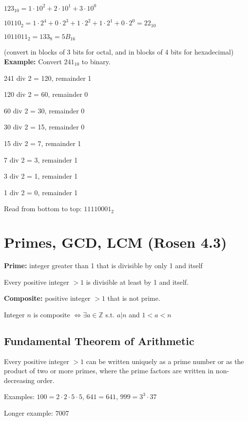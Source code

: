 \documentclass[english,openany]{book}
\begin{document}
    $123_{10} = 1 \cdot 10^2 + 2 \cdot 10^1 + 3 \cdot 10^0$

    $10110_2 = 1 \cdot 2^4 + 0 \cdot 2^3 + 1 \cdot 2^2 + 1 \cdot 2^1 + 0 \cdot 2^0 = 22_{10}$


    $1011011_2 = 133_8 = 5B_{16}$

    (convert in blocks of 3 bits for octal, and in blocks of 4 bits for hexadecimal)\\

    \textbf{Example:} Convert $241_{10}$ to binary.

    241 div 2 = 120, remainder 1

    120 div 2 = 60, remainder 0

    60 div 2 = 30, remainder 0

    30 div 2 = 15, remainder 0

    15 div 2 = 7, remainder 1

    7 div 2 = 3, remainder 1

    3 div 2 = 1, remainder 1

    1 div 2 = 0, remainder 1

    Read from bottom to top: $11110001_2$

    \section{Primes, GCD, LCM (Rosen 4.3)}

    \textbf{Prime:} integer greater than 1 that is divisible by only 1 and itself

    Every positive integer $>1$ is divisible at least by 1 and itself.

    \textbf{Composite:} positive integer $>1$ that is not prime.

    Integer $n$ is composite $\iff \exists a \in \mathbb Z$ s.t. $a | n$ and $1 < a < n$

    \subsection{Fundamental Theorem of Arithmetic}

    Every positive integer $>1$ can be written uniquely as a prime number or as the product of two or more primes, where the prime factors are written in non-decreasing order.

    Examples: $100 = 2 \cdot 2 \cdot 5 \cdot 5$, $641 = 641$, $999 = 3^3 \cdot 37$

    Longer example: $7007$
\end{document}
